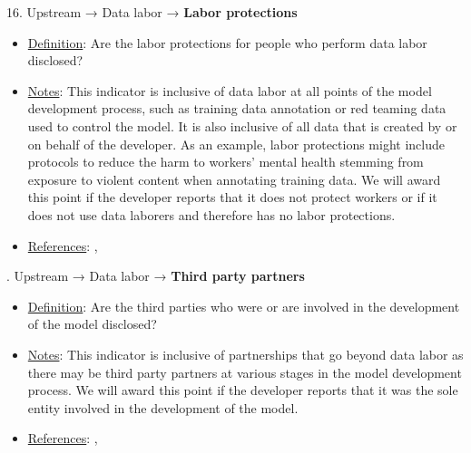 16. Upstream → Data labor → \textbf{Labor protections}
\vspace{-\parskip}
\begin{itemize}
	\item
	\underline{Definition}: Are the labor protections for people who perform data labor disclosed?
	\item
	\underline{Notes}: This indicator is inclusive of data labor at all points of the model development process, such as training data annotation or red teaming data used to control the model. It is also inclusive of all data that is created by or on behalf of the developer. As an example, labor protections might include protocols to reduce the harm to workers' mental health stemming from exposure to violent content when annotating training data. We will award this point if the developer reports that it does not protect workers or if it does not use data laborers and therefore has no labor protections.
	\item
	\underline{References}: \citet{crawford2021atlas}, \citet{gray2019ghost}
\end{itemize} \vspace{\baselineskip}


. Upstream → Data labor → \textbf{Third party partners}
\vspace{-\parskip}
\begin{itemize}
	\item
	\underline{Definition}: Are the third parties who were or are involved in the development of the model disclosed?
	\item
	\underline{Notes}: This indicator is inclusive of partnerships that go beyond data labor as there may be third party partners at various stages in the model development process. We will award this point if the developer reports that it was the sole entity involved in the development of the model.
	\item
	\underline{References}: \citet{crawford2021atlas}, \citet{gray2019ghost}
\end{itemize} \vspace{\baselineskip}


